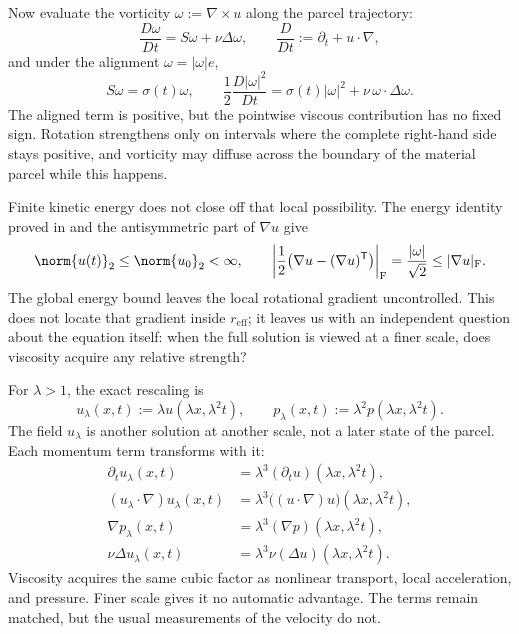 Now evaluate the vorticity \(\omega:=\nabla\times u\) along the parcel trajectory:
\[
  \frac{D\omega}{Dt}
  =
  S\omega+\nu\Delta\omega,
  \qquad
  \frac{D}{Dt}
  :=
  \partial_t+u\cdot\nabla,
\]
and under the alignment \(\omega=|\omega|e\),
\[
  S\omega
  =
  \sigma(t)\omega,
  \qquad
  \frac12\frac{D|\omega|^2}{Dt}
  =
  \sigma(t)|\omega|^2
  +
  \nu\,\omega\cdot\Delta\omega.
\]
The aligned term is positive, but the pointwise viscous contribution has no fixed sign. Rotation strengthens only on intervals where the complete right-hand side stays positive, and vorticity may diffuse across the boundary of the material parcel while this happens.

Finite kinetic energy does not close off that local possibility. The energy identity proved in  and the antisymmetric part of \(\nabla u\) give
\[
  \norm{u(t)}_2
  \leq
  \norm{u_0}_2
  <\infty,
  \qquad
  \left|\frac12\bigl(\nabla u-(\nabla u)^{\mathsf T}\bigr)\right|_{\mathrm F}
  =
  \frac{|\omega|}{\sqrt2}
  \leq
  |\nabla u|_{\mathrm F}.
\]
The global energy bound leaves the local rotational gradient uncontrolled. This does not locate that gradient inside \(r_{\mathrm{eff}}\); it leaves us with an independent question about the equation itself: when the full solution is viewed at a finer scale, does viscosity acquire any relative strength?


For \(\lambda>1\), the exact \NavierStokes{} rescaling is
\[
  u_\lambda(x,t)
  :=
  \lambda u(\lambda x,\lambda^2t),
  \qquad
  p_\lambda(x,t)
  :=
  \lambda^2p(\lambda x,\lambda^2t).
\]
The field \(u_\lambda\) is another solution at another scale, not a later state of the parcel. Each momentum term transforms with it:
\[
\begin{aligned}
  \partial_tu_\lambda(x,t)
  &=
  \lambda^3(\partial_tu)(\lambda x,\lambda^2t),
  \\
  (u_\lambda\cdot\nabla)u_\lambda(x,t)
  &=
  \lambda^3\bigl((u\cdot\nabla)u\bigr)(\lambda x,\lambda^2t),
  \\
  \nabla p_\lambda(x,t)
  &=
  \lambda^3(\nabla p)(\lambda x,\lambda^2t),
  \\
  \nu\Delta u_\lambda(x,t)
  &=
  \lambda^3\nu(\Delta u)(\lambda x,\lambda^2t).
\end{aligned}
\]
Viscosity acquires the same cubic factor as nonlinear transport, local acceleration, and pressure. Finer scale gives it no automatic advantage. The terms remain matched, but the usual measurements of the velocity do not.

